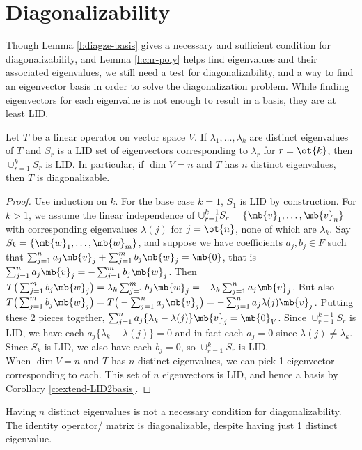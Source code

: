 \section{Diagonalizability}
Though Lemma \ref{l:diagze-basis} gives a necessary and sufficient condition for diagonalizability, and Lemma \ref{l:chr-poly} helps find eigenvalues and their associated eigenvalues, we still need a test for diagonalizability, and a way to find an eigenvector basis in order to solve the diagonalization problem.
While finding eigenvectors for each eigenvalue is not enough to result in a basis, they are at least LID.
\begin{lem}\label{l:dnct-eval-lid}
Let $T$ be a linear operator on vector space $V$. If $\lambda_1, \ldots, \lambda_k$ are distinct eigenvalues of $T$ and $S_r$ is a LID set of eigenvectors corresponding to $\lambda_r$ for $r=\ot{k}$, then $\cup_{r=1}^kS_r$ is LID.
In particular, if $\dim V=n$ and $T$ has $n$ distinct eigenvalues, then $T$ is diagonalizable.
\end{lem}
\begin{proof}%
Use induction on $k$. For the base case $k=1$, $S_1$ is LID by construction. For $k>1$, we assume the linear independence of $\cup_{r=1}^{k-1}S_r= \{ \mb{v}_1, \ldots, \mb{v}_n \}$ with corresponding eigenvalues $\lambda(j)$ for $j= \ot{n}$, none of which are $\lambda_k$.
Say $S_k= \{ \mb{w}_1, \ldots, \mb{w}_m \}$, and suppose we have coefficients $a_j,b_j \in F$ such that $\sum_{j=1}^na_j \mb{v}_j+ \sum_{j=1}^mb_j \mb{w}_j= \mb{0}$, that is $\sum_{j=1}^na_j \mb{v}_j=- \sum_{j=1}^mb_j \mb{w}_j$.
Then $T \big( \sum_{j=1}^mb_j \mb{w}_j \big) = \lambda_k \sum_{j=1}^mb_j \mb{w}_j=- \lambda_k \sum_{j=1}^na_j \mb{v}_j$. But also $T \big( \sum_{j=1}^mb_j \mb{w}_j \big) =T \big( - \sum_{j=1}^na_j \mb{v}_j \big) =- \sum_{j=1}^na_j \lambda(j) \mb{v}_j$.
Putting these 2 pieces together, $\sum_{j=1}^na_j \{ \lambda_k- \lambda(j) \} \mb{v}_j= \mb{0}_V$. Since $\cup_{r=1}^{k-1}S_r$ is LID, we have each $a_j \{ \lambda_k- \lambda(j) \} =0$ and in fact each $a_j=0$ since $\lambda(j) \neq \lambda_k$.
Since $S_k$ is LID, we also have each $b_j=0$, so $\cup_{r=1}^kS_r$ is LID.\\
When $\dim V=n$ and $T$ has $n$ distinct eigenvalues, we can pick 1 eigenvector corresponding to each. This set of $n$ eigenvectors is LID, and hence a basis by Corollary \ref{c:extend-LID2basis}.
\end{proof}
Having $n$ distinct eigenvalues is not a necessary condition for diagonalizability. The identity operator/ matrix is diagonalizable, despite having just 1 distinct eigenvalue.
